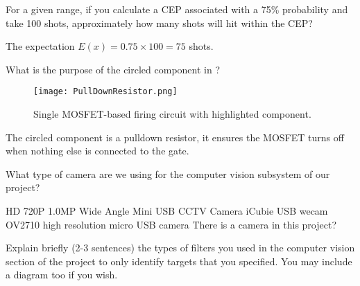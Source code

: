 \documentclass[addpoints,answers]{exam}
\begin{document}
\begin{questions}
\clearpage
\question
For a given range, if you calculate a CEP associated with a 75\% probability and take 100 shots, approximately how many shots will hit within the CEP?
\begin{solution}[3in]
The expectation $E(x) = 0.75\times 100 = 75$ shots. 
\end{solution}





\question
What is the purpose of the circled component in ?
\begin{figure}[h]
\centering
	\texttt{[image: PullDownResistor.png]}
	\caption{Single MOSFET-based firing circuit with highlighted component.}
	\label{fig:PullDownResistor}
\end{figure}
\begin{solution}[3in]
The circled component is a pulldown resistor, it ensures the MOSFET turns off when nothing else is connected to the gate. 
\end{solution}




\clearpage
\question
What type of camera are we using for the computer vision subsystem of our project?
\begin{choices}
\choice HD 720P 1.0MP Wide Angle Mini USB CCTV Camera
\CorrectChoice iCubie USB wecam
\choice OV2710 high resolution micro USB camera
\choice There is a camera in this project?
\end{choices}








\question
Explain briefly (2-3 sentences) the types of filters you used in the computer vision section of the project to only identify targets that you specified. You may include a diagram too if you wish. 
\begin{solution}[3in]
\end{solution}

\end{questions}
\end{document}
